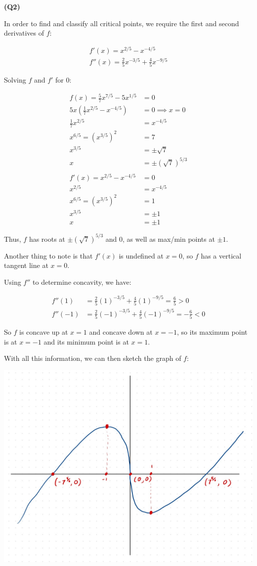 \documentclass[12pt, a4paper]{article}
\begin{document}
\textbf{(Q2)}

In order to find and classify all critical points, we require the first
and second derivatives of $f$:

\begin{gather*}
    f'(x) = x^{2/5} - x^{-4/5}\\
    f''(x) = \frac{2}{5}x^{-3/5} + \frac{4}{5}x^{-9/5}
\end{gather*}

Solving $f$ and $f'$ for 0:

\begin{align*}
    f(x) = \frac{5}{7}x^{7/5} - 5x^{1/5} & = 0\\
    5x(\frac{1}{7}x^{2/5} - x^{-4/5}) & = 0 \implies x = 0\\
    \frac{1}{7}x^{2/5} & = x^{-4/5}\\
    x^{6/5} = (x^{3/5})^2 & = 7\\
    x^{3/5} & = \pm \sqrt{7}\\
    x & = \pm (\sqrt{7})^{5/3}\\
    \\
    f'(x) = x^{2/5} - x^{-4/5} & = 0\\
    x^{2/5} & = x^{-4/5}\\
    x^{6/5} = (x^{3/5})^2 & = 1\\
    x^{3/5} & = \pm 1\\
    x & = \pm 1
\end{align*}

Thus, $f$ has roots at $\pm(\sqrt{7})^{5/3}$ and $0$, as well as max/min points
at $\pm 1$.

Another thing to note is that $f'(x)$ is undefined at $x = 0$, so $f$ has a
vertical tangent line at $x = 0$.

Using $f''$ to determine concavity, we have:

\begin{align*}
    f''(1) & = \frac{2}{5}(1)^{-3/5} + \frac{4}{5}(1)^{-9/5} = \frac{6}{5} > 0\\
    f''(-1) & = \frac{2}{5}(-1)^{-3/5} + \frac{4}{5}(-1)^{-9/5} = - \frac{6}{5} < 0
\end{align*}

So $f$ is concave up at $x = 1$ and concave down at $x = -1$, so its maximum
point is at $x = -1$ and its minimum point is at $x = 1$.

With all this information, we can then sketch the graph of $f$:

\begin{center}
\includegraphics[width=15cm]{q2_sketch.JPG}
\end{center}
\end{document}

